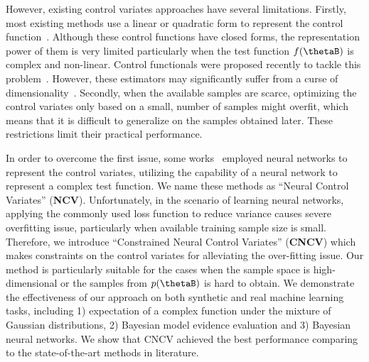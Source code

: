 \documentclass[runningheads]{llncs}
\begin{document}
However, existing control variates approaches have several limitations. Firstly, most existing methods use a linear or quadratic form to represent the control function~\cite{mira2013zero,oates2016controlled}. Although these control functions have closed forms, the representation power of them is very limited particularly when the test function $f(\thetaB)$ is complex and non-linear. Control functionals were proposed recently to tackle this problem~\cite{oates2017control}. However, these estimators may significantly suffer from a curse of dimensionality~\cite{oates2016convergence}. Secondly, when the available samples are scarce, optimizing the control variates only based on a small, number of samples might overfit, which means that it is difficult to generalize on the samples obtained later. These restrictions limit their practical performance. 

In order to overcome the first issue, some works~\cite{liu2017action, tucker2017rebar} employed neural networks to represent the control variates, utilizing the capability of a neural network to represent a complex test function. We name these methods as ``Neural Control Variates'' (\textbf{NCV}). Unfortunately, in the scenario of learning neural networks,  applying the commonly used loss function to reduce variance causes severe overfitting issue, particularly when available training sample size is small. Therefore, we introduce ``Constrained Neural Control Variates'' (\textbf{CNCV}) which makes constraints on the control variates for alleviating the over-fitting issue.   %
Our method is particularly suitable for the cases when the sample space is high-dimensional or the samples from $p(\thetaB)$ is hard to obtain.  We demonstrate the effectiveness of our approach on both synthetic and real machine learning tasks, including 1) expectation of a complex function under the mixture of Gaussian distributions,  2) Bayesian model evidence evaluation and 3) Bayesian neural networks.  We show that CNCV achieved the best performance comparing to the state-of-the-art methods in literature.  


\end{document}
